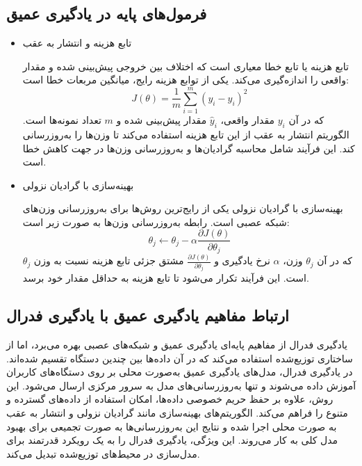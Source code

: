 \subsection{فرمول‌های پایه در یادگیری عمیق}
\begin{itemize}
\item تابع هزینه و انتشار به عقب

تابع هزینه یا تابع خطا معیاری است که اختلاف بین خروجی پیش‌بینی شده و مقدار واقعی را اندازه‌گیری می‌کند. یکی از توابع هزینه رایج، میانگین مربعات خطا%
است:
\begin{equation}
	J(\theta) = \frac{1}{m} \sum_{i=1}^{m} (y_i - \hat{y}_i)^2
\end{equation}
که در آن
$y_i$
مقدار واقعی،
$\hat{y}_i$
مقدار پیش‌بینی شده و
$m$
تعداد نمونه‌ها است. الگوریتم انتشار به عقب از این تابع هزینه استفاده می‌کند تا وزن‌ها را به‌روزرسانی کند. این فرآیند شامل محاسبه گرادیان‌ها و به‌روزرسانی وزن‌ها در جهت کاهش خطا است.


\item بهینه‌سازی با گرادیان نزولی

بهینه‌سازی با گرادیان نزولی یکی از رایج‌ترین روش‌ها برای به‌روزرسانی وزن‌های شبکه عصبی است. رابطه به‌روزرسانی وزن‌ها به صورت زیر است:
\begin{equation}
	\theta_{j} \leftarrow \theta_{j} - \alpha \frac{\partial J(\theta)}{\partial \theta_{j}}
\end{equation}
که در آن
$\theta_{j}$
وزن،
$\alpha$
نرخ یادگیری و
$\frac{\partial J(\theta)}{\partial \theta_{j}}$
مشتق جزئی تابع هزینه نسبت به وزن
$\theta_{j}$
است. این فرآیند تکرار می‌شود تا تابع هزینه به حداقل مقدار خود برسد.
\end{itemize}


\subsection{ارتباط مفاهیم یادگیری عمیق با یادگیری فدرال}
یادگیری فدرال از مفاهیم پایه‌ای یادگیری عمیق و شبکه‌های عصبی بهره می‌برد، اما از ساختاری توزیع‌شده استفاده می‌کند که در آن داده‌ها بین چندین دستگاه تقسیم شده‌اند. در یادگیری فدرال، مدل‌های یادگیری عمیق به‌صورت محلی بر روی دستگاه‌های کاربران آموزش داده می‌شوند و تنها به‌روزرسانی‌های مدل به سرور مرکزی ارسال می‌شود. این روش، علاوه بر حفظ حریم خصوصی داده‌ها، امکان استفاده از داده‌های گسترده و متنوع را فراهم می‌کند. الگوریتم‌های بهینه‌سازی مانند گرادیان نزولی و انتشار به عقب به صورت محلی اجرا شده و نتایج این به‌روزرسانی‌ها به صورت تجمیعی برای بهبود مدل کلی به کار می‌روند. این ویژگی، یادگیری فدرال را به یک رویکرد قدرتمند برای مدل‌سازی در محیط‌های توزیع‌شده تبدیل می‌کند.



